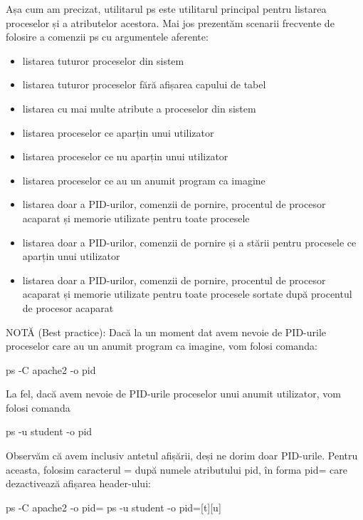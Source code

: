 Așa cum am precizat, utilitarul ps este utilitarul principal pentru listarea
proceselor și a atributelor acestora. Mai jos prezentăm scenarii frecvente de
folosire a comenzii ps cu argumentele aferente:

\begin{itemize}
	\item listarea tuturor proceselor din sistem
	\item listarea tuturor proceselor fără afișarea capului de tabel
	\item listarea cu mai multe atribute a proceselor din sistem
	\item listarea proceselor ce aparțin unui utilizator
	\item listarea proceselor ce nu aparțin unui utilizator
	\item listarea proceselor ce au un anumit program ca imagine
	\item listarea doar a PID-urilor, comenzii de pornire, procentul de
		procesor acaparat și memorie utilizate pentru toate procesele
	\item listarea doar a PID-urilor, comenzii de pornire și a stării pentru
		procesele ce aparțin unui utilizator
	\item listarea doar a PID-urilor, comenzii de pornire, procentul de
		procesor acaparat și memorie utilizate pentru toate procesele
		sortate după procentul de procesor acaparat
\end{itemize}

NOTĂ (Best practice): Dacă la un moment dat avem nevoie de PID-urile proceselor
care au un anumit program ca imagine, vom folosi comanda:

\begin{screen}
ps -C apache2 -o pid
\end{screen}

La fel, dacă avem nevoie de PID-urile proceselor unui anumit utilizator, vom
folosi comanda

\begin{screen}
ps -u student -o pid
\end{screen}

Observăm că avem inclusiv antetul afișării, deși ne dorim doar PID-urile. Pentru
aceasta, folosim caracterul = după numele atributului pid, în forma pid= care
dezactivează afișarea header-ului:

\begin{screen}
ps -C apache2 -o pid=
ps -u student -o pid=[t][u]
\end{screen}


